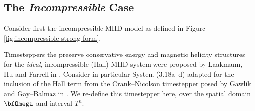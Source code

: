 \subsection*{The \emph{Incompressible} Case}
    Consider first the incompressible MHD model as defined in Figure \ref{fig:incompressible strong form}.

    \line

    Timesteppers the preserve conservative energy and magnetic helicity structures for the \emph{ideal}, incompressible (Hall) MHD system were proposed by Laakmann, Hu and Farrell in \cite{Laakmann_Hu_Farrell_2022}. Consider in particular System (3.18a--d) adapted for the inclusion of the Hall term from the Crank--Nicolson timestepper posed by Gawlik and Gay--Balmaz in \cite{Gawlik_Gay--Balmaz_2022}. We re-define this timestepper here, over the spatial domain $\bfOmega$ and interval $T^{n}$.

    \shortline

